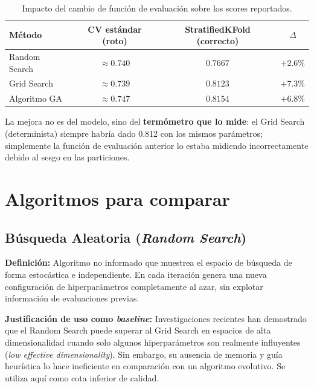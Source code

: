 \documentclass[12pt, a4paper]{article}
\begin{document}
\renewcommand{\arraystretch}{1.3}
\begin{table}[H]
  \centering
  \caption{Impacto del cambio de función de evaluación sobre los scores reportados.}
  \label{tab:impacto_cv}
  \begin{tabular}{lccc}
    \toprule
    \textbf{Método} & \textbf{CV estándar (roto)} & \textbf{StratifiedKFold (correcto)} & \textbf{$\Delta$} \\
    \midrule
    Random Search   & $\approx 0.740$             & $0.7667$                            & $+2.6\%$          \\
    Grid Search     & $\approx 0.739$             & $0.8123$                            & $+7.3\%$          \\
    Algoritmo GA    & $\approx 0.747$             & $\mathbf{0.8154}$                   & $+6.8\%$          \\
    \bottomrule
  \end{tabular}
\end{table}
\renewcommand{\arraystretch}{1}

La mejora no es del modelo, sino del \textbf{termómetro que lo mide}: el Grid Search
(determinista) siempre habría dado 0.812 con los mismos parámetros; simplemente la
función de evaluación anterior lo estaba midiendo incorrectamente debido al sesgo en
las particiones.

\section{Algoritmos para comparar}

\subsection{Búsqueda Aleatoria (\textit{Random Search})}

\textbf{Definición:} Algoritmo no informado que muestrea el espacio de búsqueda de forma
estocástica e independiente. En cada iteración genera una nueva configuración de
hiperparámetros completamente al azar, sin explotar información de evaluaciones previas.

\textbf{Justificación de uso como \textit{baseline}:} Investigaciones recientes han
demostrado que el Random Search puede superar al Grid Search en espacios de alta
dimensionalidad cuando solo algunos hiperparámetros son realmente influyentes
(\textit{low effective dimensionality}). Sin embargo, su ausencia de memoria y guía
heurística lo hace ineficiente en comparación con un algoritmo evolutivo. Se utiliza
aquí como cota inferior de calidad.
\end{document}
